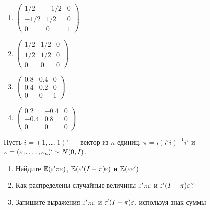 \documentclass[pdftex,11pt,openany]{book}\usepackage[]{graphicx}\usepackage[]{color}
\begin{document}
\begin{problem}
\begin{enumerate}
\item
$\begin{pmatrix} 1/2 & -1/2 & 0 \\ -1/2 & 1/2 & 0 \\ 0 & 0 & 1 \end{pmatrix}$

\item
$\begin{pmatrix} 1/2 & 1/2 & 0 \\ 1/2 & 1/2 & 0 \\ 0 & 0 & 0 \end{pmatrix}$

\item 
$\begin{pmatrix} 0.8 & 0.4 & 0 \\ 0.4 & 0.2 & 0 \\ 0 & 0 & 1 \end{pmatrix}$

\item 
$\begin{pmatrix} 0.2 & -0.4 & 0 \\ -0.4 & 0.8 & 0 \\ 0 & 0 & 0 \end{pmatrix}$

\end{enumerate}
\end{problem}

\begin{solution}
\end{solution}

\begin{problem}
Пусть $i = (1,\dots,1)'$ --- вектор из $n$ единиц, $\pi=i(i'i)^{-1}i'$ и $\varepsilon = (\varepsilon_1,\dots,\varepsilon_n)'\sim N (0,I)$.
\begin{enumerate}
\item Найдите $\mathbb{E}(\varepsilon'\pi\varepsilon)$, $\mathbb{E}(\varepsilon'(I-\pi)\varepsilon)$ и $\mathbb{E}(\varepsilon\varepsilon')$
\item Как распределены случайные величины $\varepsilon'\pi\varepsilon$ и $\varepsilon'(I-\pi)\varepsilon$?
\item Запишите выражения $\varepsilon'\pi\varepsilon$ и $\varepsilon'(I-\pi)\varepsilon$, используя знак суммы
\end{enumerate}
\end{problem}


\begin{solution}
\end{solution}
\end{document}
